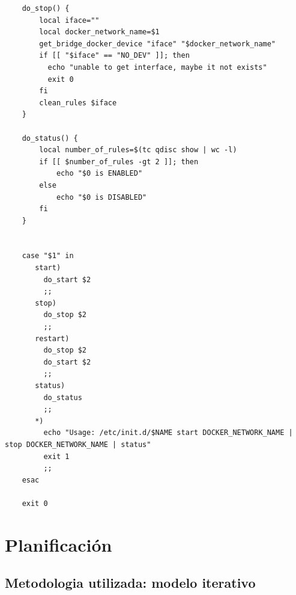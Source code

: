 \begin{verbatim}
    do_stop() {
        local iface=""
        local docker_network_name=$1
        get_bridge_docker_device "iface" "$docker_network_name"
        if [[ "$iface" == "NO_DEV" ]]; then
          echo "unable to get interface, maybe it not exists"
          exit 0
        fi
        clean_rules $iface
    }
    
    do_status() {
        local number_of_rules=$(tc qdisc show | wc -l)
        if [[ $number_of_rules -gt 2 ]]; then
            echo "$0 is ENABLED"
        else
            echo "$0 is DISABLED"
        fi
    }
    
    
    case "$1" in
       start)
         do_start $2
         ;;
       stop)
         do_stop $2
         ;;
       restart)
         do_stop $2
         do_start $2
         ;;
       status)
         do_status
         ;;
       *)
         echo "Usage: /etc/init.d/$NAME start DOCKER_NETWORK_NAME | stop DOCKER_NETWORK_NAME | status"
         exit 1
         ;;
    esac
    
    exit 0    
\end{verbatim}
\bigskip




\section{Planificación}



\subsection{Metodologia utilizada: modelo iterativo}

